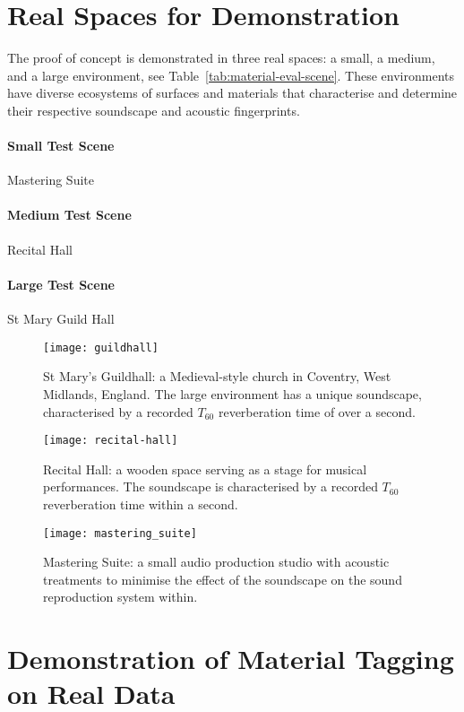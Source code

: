 \section{Real Spaces for Demonstration}
The proof of concept is demonstrated in three real spaces: a small, a medium, and a large environment, see Table~\ref{tab:material-eval-scene}. These environments have diverse ecosystems of surfaces and materials that characterise and determine their respective soundscape and acoustic fingerprints.

\paragraph{Small Test Scene}
Mastering Suite

\paragraph{Medium Test Scene}
Recital Hall

\paragraph{Large Test Scene}
St Mary Guild Hall

\begin{figure}[htbp]
    \centering
    \texttt{[image: guildhall]}
    \caption[Proof of concept demonstration --- large environment]{St Mary's Guildhall: a Medieval-style church in Coventry, West Midlands, England. The large environment has a unique soundscape, characterised by a recorded $T_{60}$ reverberation time of over a second.}
    \label{fig:guildhall-iso-render}
\end{figure}

\begin{figure}[htbp]
    \centering
    \texttt{[image: recital-hall]}
    \caption[Proof of concept demonstration --- medium environment]{Recital Hall: a wooden space serving as a stage for musical performances. The soundscape is characterised by a recorded $T_{60}$ reverberation time within a second.}
    \label{fig:conservatoire-iso-render}
\end{figure}

\begin{figure}[htbp]
    \centering
    \texttt{[image: mastering\_suite]}
    \caption[Proof of concept demonstration --- small environment]{Mastering Suite: a small audio production studio with acoustic treatments to minimise the effect of the soundscape on the sound reproduction system within.}
    \label{fig:mastering-iso-render}
\end{figure}

\section{Demonstration of Material Tagging on Real Data}

